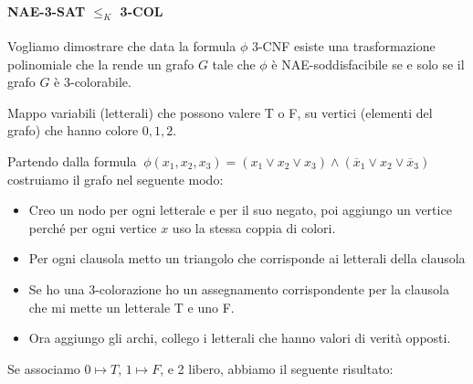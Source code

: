 \documentclass[a4paper]{article}
\theoremstyle{definition}
\begin{document}
		\paragraph{NAE-3-SAT $ \leq_K $ 3-COL } Vogliamo dimostrare che data la formula $ \phi $ 3-CNF esiste una trasformazione polinomiale che la rende un grafo $ G $ tale che $ \phi $ è NAE-soddisfacibile se e solo se il grafo $ G $ è 3-colorabile.
			 		
 		Mappo variabili (letterali) che possono valere T o F, su vertici (elementi del grafo) che hanno colore $ 0, 1, 2 $.
 		
 		 
 		 Partendo dalla formula $ \ \phi(x_1, x_2, x_3) = (x_1\vee x_2\vee x_3)\wedge(\overline{x}_1\vee x_2\vee\overline{x}_3) \ $ costruiamo il grafo nel seguente modo:
 		 \begin{itemize}
 		 	\item Creo un nodo per ogni letterale e per il suo negato, poi aggiungo un vertice perché per ogni vertice $ x $ uso la stessa coppia di colori.
 		 	\item Per ogni clausola metto un triangolo che corrisponde ai letterali della clausola
 		 	\item Se ho una 3-colorazione ho un assegnamento corrispondente per la clausola che mi mette un letterale T e uno F.
 		 	\item Ora aggiungo gli archi, collego i letterali che hanno valori di verità opposti.
 		 \end{itemize}

		Se associamo $ 0\mapsto T $, $ 1\mapsto F $, e 2 libero, abbiamo il seguente risultato:
 		 
\end{document}
